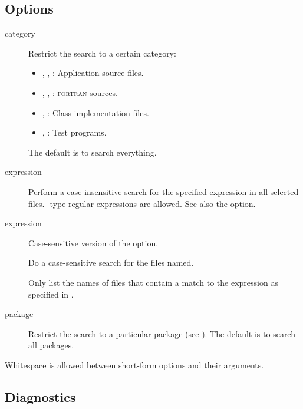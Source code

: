\subsection*{Options}

\begin{description}
\item[ category]
   Restrict the search to a certain category:
   \begin{itemize}
      \item
      , , : Application source files.

      \item
      , , : \textsc{fortran} sources.

      \item
      , : Class implementation files.

      \item
      , : Test programs.
   \end{itemize}
   The default is to search everything.

\item[ expression]
   Perform a case-insensitive search for the specified expression in all
   selected files.  -type regular expressions are allowed.
   See also the  option.

\item[ expression]
   Case-sensitive version of the  option.

\item[]
   Do a case-sensitive search for the files named.

\item[]
   Only list the names of files that contain a match to the expression 
   as specified in .

\item[ package]
   Restrict the search to a particular package (see ).
   The default is to search all packages.
\end{description}

\noindent
Whitespace is allowed between short-form options and their arguments.

\subsection*{Diagnostics}

